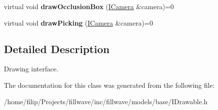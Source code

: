 \begin{DoxyCompactItemize}
\item 
virtual void {\bfseries draw\+Occlusion\+Box} (\hyperlink{classflw_1_1flf_1_1ICamera}{I\+Camera} \&camera)=0\hypertarget{classflw_1_1flf_1_1IDrawable_a479fa858127eb85c200ad32bd672c3e9}{}\label{classflw_1_1flf_1_1IDrawable_a479fa858127eb85c200ad32bd672c3e9}

\item 
virtual void {\bfseries draw\+Picking} (\hyperlink{classflw_1_1flf_1_1ICamera}{I\+Camera} \&camera)=0\hypertarget{classflw_1_1flf_1_1IDrawable_a497b4bf675dca36654e98f114cd6953f}{}\label{classflw_1_1flf_1_1IDrawable_a497b4bf675dca36654e98f114cd6953f}

\end{DoxyCompactItemize}


\subsection{Detailed Description}
Drawing interface. 

The documentation for this class was generated from the following file\+:\begin{DoxyCompactItemize}
\item 
/home/filip/\+Projects/fillwave/inc/fillwave/models/base/I\+Drawable.\+h\end{DoxyCompactItemize}
